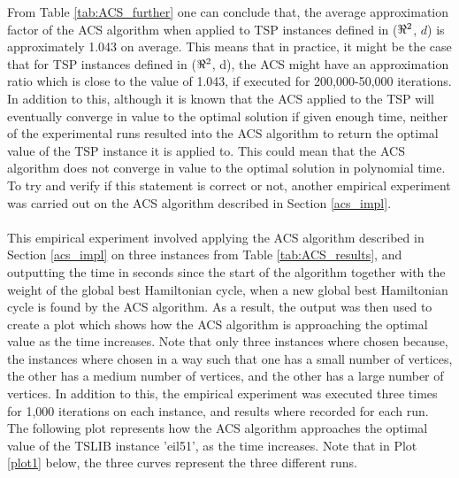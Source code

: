 \documentclass{article}
\begin{document}
From Table \ref{tab:ACS_further} one can conclude that, the average approximation factor of the ACS algorithm when applied to TSP instances defined in ($\real^2$, $d$) is approximately 1.043 on average. This means that in practice, it might be the case that for TSP instances defined in ($\real^2$, d), the ACS might have an approximation ratio which is close to the value of 1.043, if executed for 200,000-50,000 iterations. In addition to this, although it is known that the ACS applied to the TSP will eventually converge in value to the optimal solution if given enough time, neither of the experimental runs resulted into the ACS algorithm to return the optimal value of the TSP instance it is applied to. This could mean that the ACS algorithm does not converge in value to the optimal solution in polynomial time. To try and verify if this statement is correct or not, another empirical experiment was carried out on the ACS algorithm described in Section \ref{acs_impl}.\\\\
This empirical experiment involved applying the ACS algorithm described in Section \ref{acs_impl} on three instances from Table \ref{tab:ACS_results}, and outputting the time in seconds since the start of the algorithm together with the weight of the global best Hamiltonian cycle, when a new global best Hamiltonian cycle is found by the ACS algorithm. As a result, the output was then used to create a plot which shows how the ACS algorithm is approaching the optimal value as the time increases. Note that only three instances where chosen because, the instances where chosen in a way such that one has a small number of vertices, the other has a medium number of vertices, and the other has a large number of vertices. In addition to this, the empirical experiment was executed three times for 1,000 iterations on each instance, and results where recorded for each run. The following plot represents how the ACS algorithm approaches the optimal value of the TSLIB instance 'eil51', as the time increases. Note that in Plot \ref{plot1} below, the three curves represent the three different runs.
\end{document}
